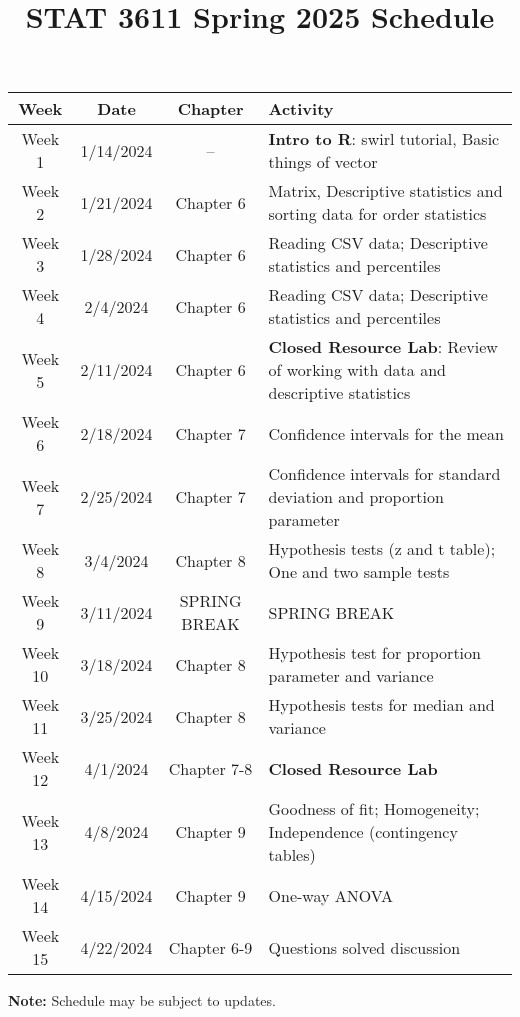 \documentclass{article}
\begin{document}
\title{\textbf{STAT 3611 Spring 2025 Schedule}}
\date{}
\maketitle

\renewcommand{\arraystretch}{1.5}
\setlength{\tabcolsep}{8pt}

\begin{longtable}{|c|c|c|p{8cm}|}
\hline
\rowcolor[HTML]{CFE2F3}
\textbf{Week} & \textbf{Date} & \textbf{Chapter} & \textbf{Activity} \\
\hline
Week 1 & 1/14/2024 & -- & \textbf{Intro to R}: swirl tutorial, Basic things of vector \\
\hline
Week 2 & 1/21/2024 & Chapter 6 & Matrix, Descriptive statistics and sorting data for order statistics \\
\hline
Week 3 & 1/28/2024 & Chapter 6 & Reading CSV data; Descriptive statistics and percentiles \\
\hline
Week 4 & 2/4/2024 & Chapter 6 & Reading CSV data; Descriptive statistics and percentiles \\
\hline
\rowcolor[HTML]{FCE5CD}
Week 5 & 2/11/2024 & Chapter 6 & \textbf{Closed Resource Lab}: Review of working with data and descriptive statistics \\
\hline
Week 6 & 2/18/2024 & Chapter 7 & Confidence intervals for the mean \\
\hline
Week 7 & 2/25/2024 & Chapter 7 & Confidence intervals for standard deviation and proportion parameter \\
\hline
Week 8 & 3/4/2024 & Chapter 8 & Hypothesis tests (z and t table); One and two sample tests \\
\hline
\rowcolor[HTML]{FFFF99}
Week 9 & 3/11/2024 & SPRING BREAK & SPRING BREAK \\
\hline
Week 10 & 3/18/2024 & Chapter 8 & Hypothesis test for proportion parameter and variance \\
\hline

Week 11 & 3/25/2024 & Chapter 8 & Hypothesis tests for median and variance  \\
\hline
\rowcolor[HTML]{FCE5CD}
Week 12 & 4/1/2024 & Chapter 7-8 & \textbf{Closed Resource Lab} \\
\hline
Week 13 & 4/8/2024 & Chapter 9 & Goodness of fit; Homogeneity; Independence (contingency tables) \\
\hline
Week 14 & 4/15/2024 & Chapter 9 & One-way ANOVA \\
\hline
Week 15 & 4/22/2024 & Chapter 6-9 & Questions solved discussion \\
\hline
\end{longtable}

\textbf{Note:} Schedule may be subject to updates.
\end{document}

